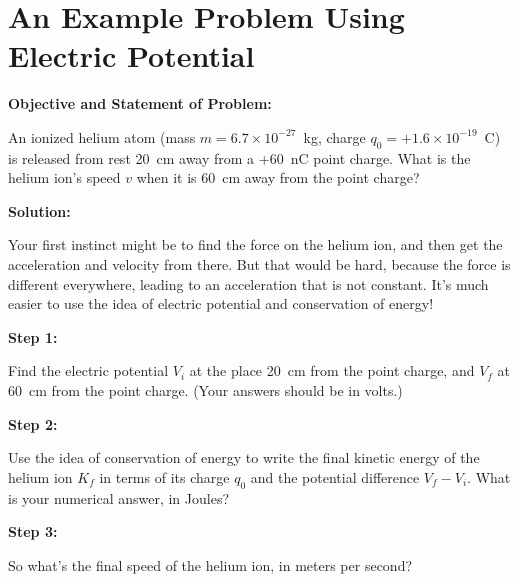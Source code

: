 \section{An Example Problem Using Electric Potential}

\begin{comment}
This lab is really just a worksheet I've used in my 132 class. --Matt Trawick, 6/2015
\end{comment}

\makelabheader %

\vspace{0.1in}
\textbf{Objective and Statement of Problem:}
 
An ionized helium atom (mass $m=6.7\times 10^{-27}$~kg, charge $q_0=+1.6\times 10^{-19}$~C) is released from rest 20~cm away from a +60~nC point charge.  What is the helium ion's speed $v$ when it is 60~cm away from the point charge?

\textbf{Solution:}

Your first instinct might be to find the force on the helium ion, and then get the acceleration and velocity from there.  But that would be hard, because the force is different everywhere, leading to an acceleration that is not constant.  It's much easier to use the idea of electric potential and conservation of energy!

\answerspace{0.1in}

\textbf{Step 1:} 

Find the electric potential $V_i$ at the place 20~cm from the point charge, and $V_f$ at 60~cm from the point charge.  (Your answers should be in volts.)
\answerspace{1.9in}


\textbf{Step 2:}

Use the idea of conservation of energy to write the final kinetic energy of the helium ion $K_f$ in terms of its charge $q_0$ and the potential difference $V_f-V_i$.  What is your numerical answer, in Joules?
\vspace{1.6in}

\textbf{Step 3:}

So what's the final speed of the helium ion, in meters per second?
\answerspace{1.4in}
